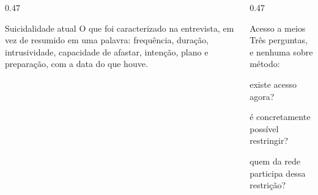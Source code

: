 \begin{frame}{}
\begin{columns}[onlytextwidth, t]
\begin{column}{0.47\textwidth}
\begin{caixaavaliar}{Suicidalidade atual}
O que foi caracterizado na entrevista, em vez de resumido em uma palavra:
frequ\^encia, dura\c{c}\~ao, intrusividade, capacidade de afastar,
inten\c{c}\~ao, plano e prepara\c{c}\~ao, com a data do que houve.
\end{caixaavaliar}
\end{column}
\calha
\begin{column}{0.47\textwidth}
\begin{caixaagir}{Acesso a meios}
Tr\^es perguntas, e nenhuma sobre m\'etodo:
\begin{itemc}
\item existe acesso agora?
\item \'e concretamente poss\'ivel restringir?
\item quem da rede participa dessa restri\c{c}\~ao?
\end{itemc}
\end{caixaagir}
\end{column}
\end{columns}

\CRvg
\begin{center}
\end{center}
\end{frame}


